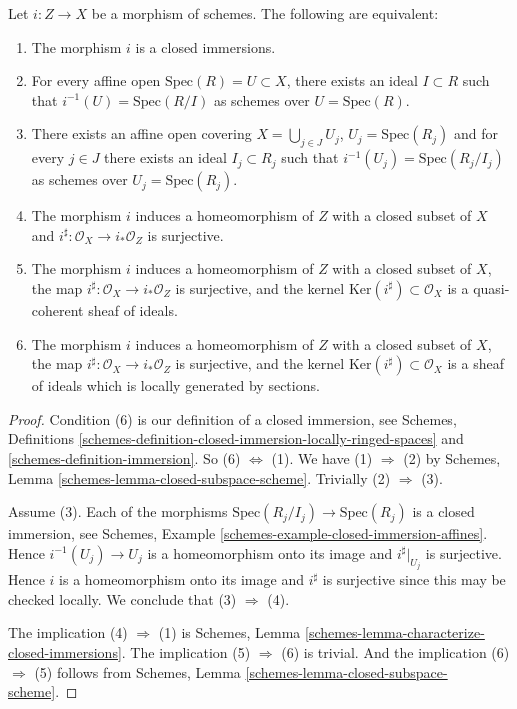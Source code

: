 \begin{lemma}
\label{lemma-closed-immersion}
Let $i : Z \to X$ be a morphism of schemes.
The following are equivalent:
\begin{enumerate}
\item The morphism $i$ is a closed immersions.
\item For every affine open $\text{Spec}(R) = U \subset X$,
there exists an ideal $I \subset R$ such that
$i^{-1}(U) = \text{Spec}(R/I)$ as schemes over $U = \text{Spec}(R)$.
\item There exists an affine open covering $X = \bigcup_{j \in J} U_j$,
$U_j = \text{Spec}(R_j)$ and for every $j \in J$ there exists
an ideal $I_j \subset R_j$ such that
$i^{-1}(U_j) = \text{Spec}(R_j/I_j)$ as schemes over $U_j = \text{Spec}(R_j)$.
\item The morphism $i$ induces a homeomorphism of $Z$ with a closed subset
of $X$ and $i^\sharp : \mathcal{O}_X \to i_*\mathcal{O}_Z$ is surjective.
\item The morphism $i$ induces a homeomorphism of $Z$ with a closed subset
of $X$, the map $i^\sharp : \mathcal{O}_X \to i_*\mathcal{O}_Z$ is surjective,
and the kernel $\text{Ker}(i^\sharp)\subset \mathcal{O}_X$ is a quasi-coherent
sheaf of ideals.
\item The morphism $i$ induces a homeomorphism of $Z$ with a closed subset
of $X$, the map $i^\sharp : \mathcal{O}_X \to i_*\mathcal{O}_Z$ is surjective,
and the kernel $\text{Ker}(i^\sharp)\subset \mathcal{O}_X$ is a
sheaf of ideals which is locally generated by sections.
\end{enumerate}
\end{lemma}

\begin{proof}
Condition (6) is our definition of a closed immersion, see Schemes,
Definitions \ref{schemes-definition-closed-immersion-locally-ringed-spaces}
and \ref{schemes-definition-immersion}.
So (6) $\Leftrightarrow$ (1). We have (1) $\Rightarrow$ (2) by
Schemes, Lemma \ref{schemes-lemma-closed-subspace-scheme}.
Trivially (2) $\Rightarrow$ (3).

\medskip\noindent
Assume (3). Each of the morphisms
$\text{Spec}(R_j/I_j) \to \text{Spec}(R_j)$ is
a closed immersion, see
Schemes, Example \ref{schemes-example-closed-immersion-affines}.
Hence $i^{-1}(U_j) \to U_j$ is a homeomorphism onto its image
and $i^\sharp|_{U_j}$ is surjective. Hence $i$ is a homeomorphism
onto its image and $i^\sharp$ is surjective since this may be
checked locally. We conclude that (3) $\Rightarrow$ (4).

\medskip\noindent
The implication (4) $\Rightarrow$ (1) is
Schemes, Lemma \ref{schemes-lemma-characterize-closed-immersions}.
The implication (5) $\Rightarrow$ (6) is trivial.
And the implication (6) $\Rightarrow$ (5) follows
from Schemes, Lemma \ref{schemes-lemma-closed-subspace-scheme}.
\end{proof}

